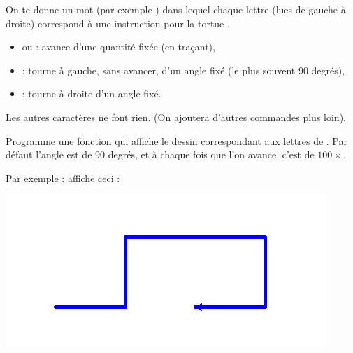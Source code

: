 \documentclass[11pt,class=report,crop=false]{standalone}
\begin{document}

\begin{activite}


On te donne un mot (par exemple ) dans lequel chaque lettre (lues de gauche à droite) correspond à une instruction pour la tortue \Python{}.

\begin{itemize}
  \item {} ou  : avance d'une quantité fixée (en traçant),
  \item {} : tourne à gauche, sans avancer, d'un angle fixé (le plus souvent $90$ degrés),
  \item {} : tourne à droite d'un angle fixé.
\end{itemize}

Les autres caractères ne font rien. (On ajoutera d'autres commandes plus loin).

Programme une fonction 
qui affiche le dessin correspondant aux lettres de . Par défaut l'angle est de $90$ degrés, et à chaque fois que l'on avance, c'est de $100 \times$.

Par exemple :  affiche ceci :
\begin{center}
\includegraphics[scale=0.6]{ecran-lsysteme-1}
\end{center}

\end{activite}


\end{document}
